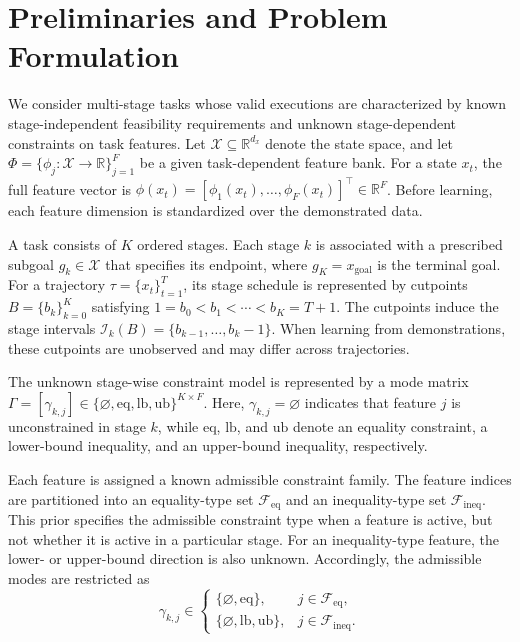 \documentclass[lettersize,journal]{IEEEtran}
\begin{document}
\section{Preliminaries and Problem Formulation}

We consider multi-stage tasks whose valid executions are characterized by known stage-independent feasibility requirements and unknown stage-dependent constraints on task features. Let $\mathcal{X}\subseteq\mathbb{R}^{d_x}$ denote the state space, and let $\Phi=\{\phi_j:\mathcal{X}\rightarrow\mathbb{R}\}_{j=1}^{F}$ be a given task-dependent feature bank. For a state $x_t$, the full feature vector is $\phi(x_t)=[\phi_1(x_t),\dots,\phi_F(x_t)]^\top\in\mathbb{R}^{F}$. Before learning, each feature dimension is standardized over the demonstrated data.

A task consists of $K$ ordered stages. Each stage $k$ is associated with a prescribed subgoal $g_k\in\mathcal{X}$ that specifies its endpoint, where $g_K=x_{\mathrm{goal}}$ is the terminal goal. For a trajectory $\tau=\{x_t\}_{t=1}^{T}$, its stage schedule is represented by cutpoints $B=\{b_k\}_{k=0}^{K}$ satisfying $1=b_0<b_1<\cdots<b_K=T+1$. The cutpoints induce the stage intervals $\mathcal{I}_k(B)=\{b_{k-1},\dots,b_k-1\}$. When learning from demonstrations, these cutpoints are unobserved and may differ across trajectories.

The unknown stage-wise constraint model is represented by a mode matrix $\Gamma=[\gamma_{k,j}]\in\{\varnothing,\mathrm{eq},\mathrm{lb},\mathrm{ub}\}^{K\times F}$. Here, $\gamma_{k,j}=\varnothing$ indicates that feature $j$ is unconstrained in stage $k$, while $\mathrm{eq}$, $\mathrm{lb}$, and $\mathrm{ub}$ denote an equality constraint, a lower-bound inequality, and an upper-bound inequality, respectively.

Each feature is assigned a known admissible constraint family. The feature indices are partitioned into an equality-type set $\mathcal{F}_{\mathrm{eq}}$ and an inequality-type set $\mathcal{F}_{\mathrm{ineq}}$. This prior specifies the admissible constraint type when a feature is active, but not whether it is active in a particular stage. For an inequality-type feature, the lower- or upper-bound direction is also unknown. Accordingly, the admissible modes are restricted as
\begin{equation}
\gamma_{k,j}\in
\begin{cases}
\{\varnothing,\mathrm{eq}\}, & j\in\mathcal{F}_{\mathrm{eq}},\\
\{\varnothing,\mathrm{lb},\mathrm{ub}\}, & j\in\mathcal{F}_{\mathrm{ineq}}.
\end{cases}
\label{eq:admissible_constraint_modes}
\end{equation}
\end{document}
